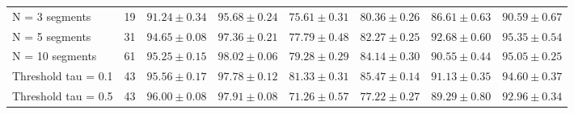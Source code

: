 \begin{table}
{\begin{tabular}{l|c|cccccc}
        N = 3 segments & 19 & $91.24 \pm 0.34$ & $95.68 \pm 0.24$ & $75.61 \pm 0.31$ & $80.36 \pm 0.26$ & $86.61 \pm 0.63$ & $90.59 \pm 0.67$ \\
        N = 5 segments & 31 & $94.65 \pm 0.08$ & $97.36 \pm 0.21$ & $77.79 \pm 0.48$ & $82.27 \pm 0.25$ & $92.68 \pm 0.60$ & $95.35 \pm 0.54$ \\
        N = 10 segments & 61 & $95.25 \pm 0.15$ & $98.02 \pm 0.06$ & $79.28 \pm 0.29$ & $84.14 \pm 0.30$ & $90.55 \pm 0.44$ & $95.05 \pm 0.25$ \\
        Threshold tau = 0.1 & 43 & $95.56 \pm 0.17$ & $97.78 \pm 0.12$ & $81.33 \pm 0.31$ & $85.47 \pm 0.14$ & $91.13 \pm 0.35$ & $94.60 \pm 0.37$ \\
        Threshold tau = 0.5 & 43 & $96.00 \pm 0.08$ & $97.91 \pm 0.08$ & $71.26 \pm 0.57$ & $77.22 \pm 0.27$ & $89.29 \pm 0.80$ & $92.96 \pm 0.34$ \\
        \hline
    \end{tabular}}
\end{table}

\begin{table}
    \centering
    \caption{Cost of the DR step on MNIST (fit on 48{,}000 training images, embedding of 12{,}000 unseen images; median of 3 runs, single run for UMAP and PaCMAP). Model size is the memory that must be kept to embed new samples.}
    \label{tab:dr_cost}
\end{table}

